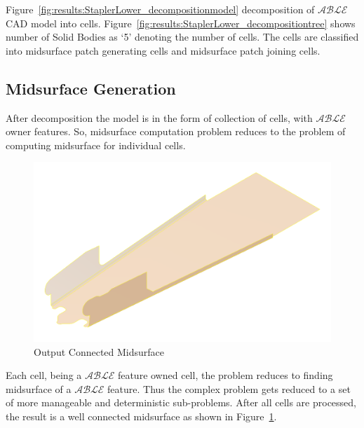 
%

Figure~\ref{fig:results:StaplerLower_decompositionmodel}  decomposition of $\mathcal{ABLE}$ CAD model into cells. Figure~\ref{fig:results:StaplerLower_decompositiontree} shows number of Solid Bodies as `5' denoting the number of cells. The cells are classified into midsurface patch generating cells and midsurface patch joining cells.


\subsection{Midsurface Generation}

After decomposition the model is in the form of collection of cells, with $\mathcal{ABLE}$ owner features. So, midsurface computation problem reduces to the problem of computing midsurface for individual cells.


\begin{figure}[!h]
\centering     %
\includegraphics[width=0.62\linewidth,valign=t]{../Common/images/StaplerLower_midsurfcelljoin_model}
\caption{Output Connected Midsurface}
\label{fig:results:staplerlowermidsurfcelljoin}
\end{figure}


 Each cell, being a $\mathcal{ABLE}$ feature owned cell, the problem reduces to finding midsurface of a $\mathcal{ABLE}$ feature.  Thus the complex problem gets reduced to a set of more manageable and deterministic sub-problems. After all cells are processed, the result is a well connected midsurface as shown in Figure~\ref{fig:results:staplerlowermidsurfcelljoin}.

